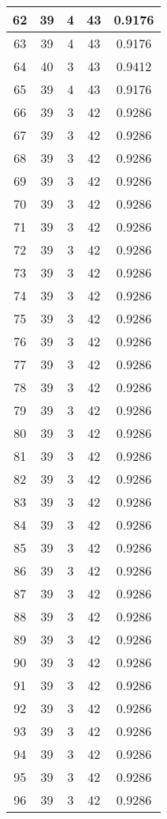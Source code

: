 \documentclass[letterpaper, 12pt]{article}
\begin{document}
\begin{longtable}{|c|c|c|c|c|}
\hline
62 & 39 & 4 & 43 & 0.9176 \\
\hline
63 & 39 & 4 & 43 & 0.9176 \\
\hline
64 & 40 & 3 & 43 & 0.9412 \\
\hline
65 & 39 & 4 & 43 & 0.9176 \\
\hline
66 & 39 & 3 & 42 & 0.9286 \\
\hline
67 & 39 & 3 & 42 & 0.9286 \\
\hline
68 & 39 & 3 & 42 & 0.9286 \\
\hline
69 & 39 & 3 & 42 & 0.9286 \\
\hline
70 & 39 & 3 & 42 & 0.9286 \\
\hline
71 & 39 & 3 & 42 & 0.9286 \\
\hline
72 & 39 & 3 & 42 & 0.9286 \\
\hline
73 & 39 & 3 & 42 & 0.9286 \\
\hline
74 & 39 & 3 & 42 & 0.9286 \\
\hline
75 & 39 & 3 & 42 & 0.9286 \\
\hline
76 & 39 & 3 & 42 & 0.9286 \\
\hline
77 & 39 & 3 & 42 & 0.9286 \\
\hline
78 & 39 & 3 & 42 & 0.9286 \\
\hline
79 & 39 & 3 & 42 & 0.9286 \\
\hline
80 & 39 & 3 & 42 & 0.9286 \\
\hline
81 & 39 & 3 & 42 & 0.9286 \\
\hline
82 & 39 & 3 & 42 & 0.9286 \\
\hline
83 & 39 & 3 & 42 & 0.9286 \\
\hline
84 & 39 & 3 & 42 & 0.9286 \\
\hline
85 & 39 & 3 & 42 & 0.9286 \\
\hline
86 & 39 & 3 & 42 & 0.9286 \\
\hline
87 & 39 & 3 & 42 & 0.9286 \\
\hline
88 & 39 & 3 & 42 & 0.9286 \\
\hline
89 & 39 & 3 & 42 & 0.9286 \\
\hline
90 & 39 & 3 & 42 & 0.9286 \\
\hline
91 & 39 & 3 & 42 & 0.9286 \\
\hline
92 & 39 & 3 & 42 & 0.9286 \\
\hline
93 & 39 & 3 & 42 & 0.9286 \\
\hline
94 & 39 & 3 & 42 & 0.9286 \\
\hline
95 & 39 & 3 & 42 & 0.9286 \\
\hline
96 & 39 & 3 & 42 & 0.9286 \\

\end{longtable}
\end{document}
